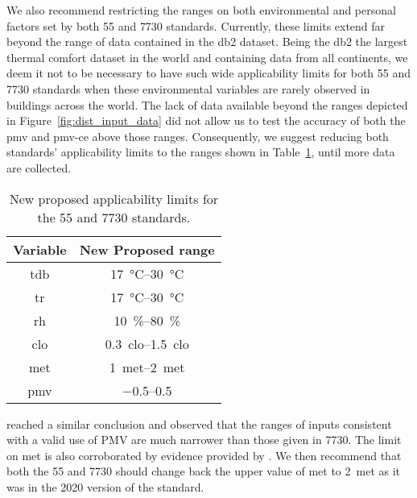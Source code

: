 We also recommend restricting the ranges on both environmental and personal factors set by both \gls{55} and \gls{7730} standards.
Currently, these limits extend far beyond the range of data contained in the \ac{db2} dataset.
Being the \ac{db2} the largest thermal comfort dataset in the world and containing data from all continents, we deem it not to be necessary to have such wide applicability limits for both \gls{55} and \gls{7730} standards when these environmental variables are rarely observed in buildings across the world.
The lack of data available beyond the ranges depicted in Figure~\ref{fig:dist_input_data} did not allow us to test the accuracy of both the \ac{pmv} and \ac{pmv-ce} above those ranges.
Consequently, we suggest reducing both standards' applicability limits to the ranges shown in Table~\ref{tab:ranges}, until more data are collected.
\begin{table}[htb!]
    \centering
    \begin{tabular}{cc}
        \toprule
        Variable & New Proposed range \\
        \midrule
        \ac{tdb} & \qtyrange{17}{30}{\celsius} \\
        \ac{tr} & \qtyrange{17}{30}{\celsius} \\
        \ac{rh} & \qtyrange{10}{80}{\percent} \\
        \ac{clo} & \qtyrange{0.3}{1.5}{clo} \\
        \ac{met} & \qtyrange{1}{2}{met} \\
        \ac{pmv} & \numrange{-.5}{.5} \\
        \bottomrule
    \end{tabular}
    \caption{New proposed applicability limits for the \gls{55} and \gls{7730} standards.}
    \label{tab:ranges}
\end{table}
 reached a similar conclusion and observed that the ranges of inputs consistent with a valid use of PMV are much narrower than those given in \gls{7730}.
The limit on \ac{met} is also corroborated by evidence provided by .
We then recommend that both the \gls{55} and \gls{7730} should change back the upper value of \ac{met} to \qty{2}{met} as it was in the 2020 version of the standard.

